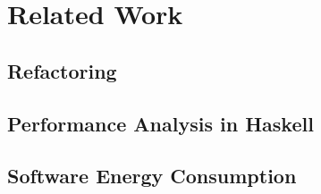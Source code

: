 \chapter{Related Work}

\section{Refactoring}
\lipsum[1-3]


\section{Performance Analysis in Haskell}
\lipsum[1-3]


\section{Software Energy Consumption}
\lipsum[1-3]
